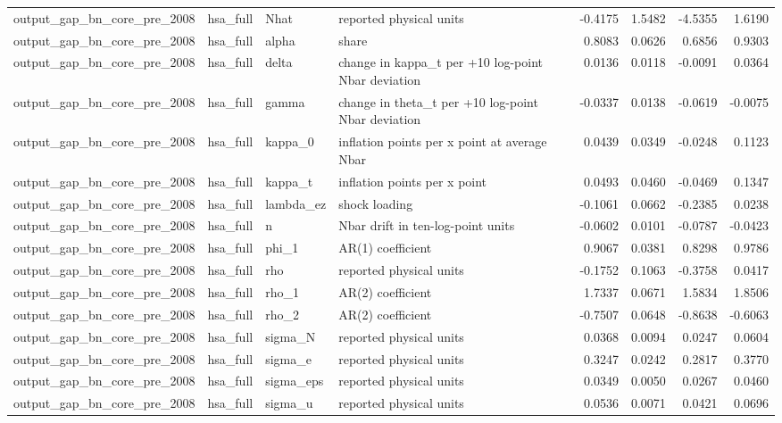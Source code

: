\begin{tabular}{llllrrrr}
output\_gap\_bn\_core\_pre\_2008 & hsa\_full & Nhat & reported physical units & -0.4175 & 1.5482 & -4.5355 & 1.6190 \\
output\_gap\_bn\_core\_pre\_2008 & hsa\_full & alpha & share & 0.8083 & 0.0626 & 0.6856 & 0.9303 \\
output\_gap\_bn\_core\_pre\_2008 & hsa\_full & delta & change in kappa\_t per +10 log-point Nbar deviation & 0.0136 & 0.0118 & -0.0091 & 0.0364 \\
output\_gap\_bn\_core\_pre\_2008 & hsa\_full & gamma & change in theta\_t per +10 log-point Nbar deviation & -0.0337 & 0.0138 & -0.0619 & -0.0075 \\
output\_gap\_bn\_core\_pre\_2008 & hsa\_full & kappa\_0 & inflation points per x point at average Nbar & 0.0439 & 0.0349 & -0.0248 & 0.1123 \\
output\_gap\_bn\_core\_pre\_2008 & hsa\_full & kappa\_t & inflation points per x point & 0.0493 & 0.0460 & -0.0469 & 0.1347 \\
output\_gap\_bn\_core\_pre\_2008 & hsa\_full & lambda\_ez & shock loading & -0.1061 & 0.0662 & -0.2385 & 0.0238 \\
output\_gap\_bn\_core\_pre\_2008 & hsa\_full & n & Nbar drift in ten-log-point units & -0.0602 & 0.0101 & -0.0787 & -0.0423 \\
output\_gap\_bn\_core\_pre\_2008 & hsa\_full & phi\_1 & AR(1) coefficient & 0.9067 & 0.0381 & 0.8298 & 0.9786 \\
output\_gap\_bn\_core\_pre\_2008 & hsa\_full & rho & reported physical units & -0.1752 & 0.1063 & -0.3758 & 0.0417 \\
output\_gap\_bn\_core\_pre\_2008 & hsa\_full & rho\_1 & AR(2) coefficient & 1.7337 & 0.0671 & 1.5834 & 1.8506 \\
output\_gap\_bn\_core\_pre\_2008 & hsa\_full & rho\_2 & AR(2) coefficient & -0.7507 & 0.0648 & -0.8638 & -0.6063 \\
output\_gap\_bn\_core\_pre\_2008 & hsa\_full & sigma\_N & reported physical units & 0.0368 & 0.0094 & 0.0247 & 0.0604 \\
output\_gap\_bn\_core\_pre\_2008 & hsa\_full & sigma\_e & reported physical units & 0.3247 & 0.0242 & 0.2817 & 0.3770 \\
output\_gap\_bn\_core\_pre\_2008 & hsa\_full & sigma\_eps & reported physical units & 0.0349 & 0.0050 & 0.0267 & 0.0460 \\
output\_gap\_bn\_core\_pre\_2008 & hsa\_full & sigma\_u & reported physical units & 0.0536 & 0.0071 & 0.0421 & 0.0696 \\

\end{tabular}
